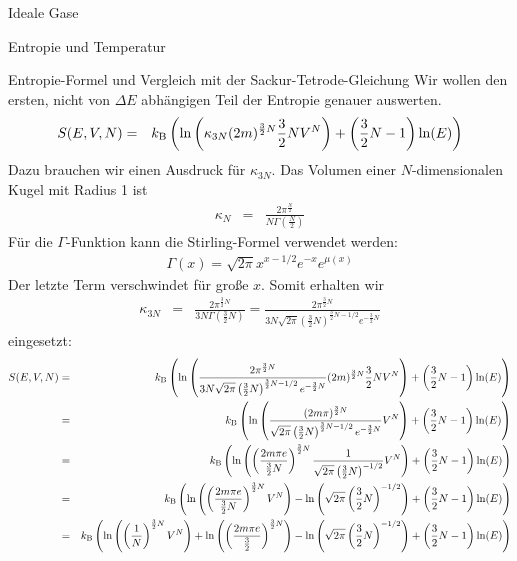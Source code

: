 \begin{chapter}{\titlestr}
\begin{section}{Ideale Gase}
\begin{subsection}{Entropie und Temperatur}
\begin{subsubsection}{Entropie-Formel und Vergleich mit der Sackur-Tetrode-Gleichung}
Wir wollen den ersten, nicht von $\Delta E$ abhängigen Teil der Entropie genauer auswerten.
\begin{eqnarray*}
S(E,V,N) &=& k_{\mathrm{B}} \left(\ln\left(\kappa_{3N}(2m)^{\frac{3}{2}N}\frac{3}{2}NV^N\right)+\left(\frac{3}{2}N-1\right)\ln(E)\right)
\end{eqnarray*}
Dazu brauchen wir einen Ausdruck für $\kappa_{3N}$. Das Volumen einer $N$-dimensionalen Kugel mit Radius 1 ist
\begin{eqnarray*}
\kappa_N &=& \frac{2\pi^\frac{N}{2}}{N\Gamma(\frac{N}{2})}
\end{eqnarray*}
Für die $\Gamma$-Funktion kann die Stirling-Formel verwendet werden:
\begin{eqnarray}
\label{stirling_gamma}
\Gamma(x) = \sqrt{2\pi}x^{x-1/2}e^{-x}e^{\mu(x)}
\end{eqnarray}
Der letzte Term verschwindet für große $x$. Somit erhalten wir
\begin{eqnarray*}
\kappa_{3N} &=& \frac{2\pi^{\frac{3}{2}N}}{3N\Gamma(\frac{3}{2}N)}
=\frac{2\pi^{\frac{3}{2}N}}{3N\sqrt{2\pi}\left(\frac{3}{2}N\right)^{\frac{3}{2}N-1/2}e^{-\frac{3}{2}N}}
\end{eqnarray*}
eingesetzt:
\begin{eqnarray*}
S(E,V,N) &=& \kb \left(\ln\left(\frac{2\pi^{\frac{3}{2}N}}{3N\sqrt{2\pi}\left(\frac{3}{2}N\right)^{\frac{3}{2}N-1/2}e^{-\frac{3}{2}N}}(2m)^{\frac{3}{2}N}\frac{3}{2}NV^N\right)+\left(\frac{3}{2}N-1\right)\ln(E)\right)\\
&=& \kb \left(\ln\left(\frac{(2m\pi)^{\frac{3}{2}N}}{\sqrt{2\pi}\left(\frac{3}{2}N\right)^{\frac{3}{2}N-1/2}e^{-\frac{3}{2}N}}V^N\right)+\left(\frac{3}{2}N-1\right)\ln(E)\right)\\
&=& \kb \left(\ln\left(\left(\frac{2m\pi e}{\frac{3}{2}N}\right)^{\frac{3}{2}N}
\frac{1}{\sqrt{2\pi}\left(\frac{3}{2}N\right)^{-1/2}}V^N\right)+\left(\frac{3}{2}N-1\right)\ln(E)\right)\\
&=& \kb \left(\ln\left(\left(\frac{2m\pi e}{\frac{3}{2}N}\right)^{\frac{3}{2}N}
V^N\right)-\ln\left(\sqrt{2\pi}\left(\frac{3}{2}N\right)^{-1/2}\right)+\left(\frac{3}{2}N-1\right)\ln(E)\right)\\
&=& \kb \left(
\ln\left(\left(\frac{1}{N}\right)^{\frac{3}{2}N}V^N\right)
+\ln\left(\left(\frac{2m\pi e}{\frac{3}{2}}\right)^{\frac{3}{2}N}\right)
-\ln\left(\sqrt{2\pi}\left(\frac{3}{2}N\right)^{-1/2}\right)+\left(\frac{3}{2}N-1\right)\ln(E)\right)\\

\end{eqnarray*}
\end{subsubsection}
\end{subsection}
\end{section}
\end{chapter}
